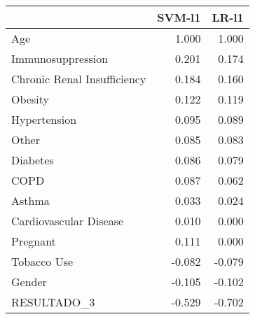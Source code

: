 \begin{tabular}{lrr}
\toprule
{} &  SVM-l1 &  LR-l1 \\
\midrule
Age                         &   1.000 &  1.000 \\
Immunosuppression           &   0.201 &  0.174 \\
Chronic Renal Insufficiency &   0.184 &  0.160 \\
Obesity                     &   0.122 &  0.119 \\
Hypertension                &   0.095 &  0.089 \\
Other                       &   0.085 &  0.083 \\
Diabetes                    &   0.086 &  0.079 \\
COPD                        &   0.087 &  0.062 \\
Asthma                      &   0.033 &  0.024 \\
Cardiovascular Disease      &   0.010 &  0.000 \\
Pregnant                    &   0.111 &  0.000 \\
Tobacco Use                 &  -0.082 & -0.079 \\
Gender                      &  -0.105 & -0.102 \\
RESULTADO\_3                 &  -0.529 & -0.702 \\
\bottomrule
\end{tabular}
